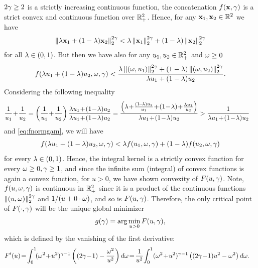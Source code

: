 \documentclass[12pt,onecolumn,journal,draftclsnofoot,letterpaper]{IEEEtran}
\begin{document}
  $2\gamma\geq2$ is a strictly increasing continuous function, the concatenation $f({\mathbf x},\gamma)$ is a strict convex and
  continuous function over ${\mathbb R}_+^2$. Hence, for any ${\mathbf x}_1,{\mathbf x}_2\in{\ensuremath{\mathbb R}}^2$ we have
  \begin{align}
     \left\|\lambda{\ensuremath{\mathbf x}}_1+(1-\lambda){\mathbf x}_2\right\| _2^{2\gamma}<\lambda  \left\|{\mathbf x}_1\right\| _2^{2\gamma} + (1-\lambda) \left\|{\mathbf x}_2\right\| _2^{2\gamma}
  \end{align}
  for all $\lambda\in(0,1)$. But then we have also for any $u_1,u_2\in{\ensuremath{\mathbb R}}^2_+$ and $\omega\geq 0$ 
  \begin{align}
    f(\lambda u_1 +(1-\lambda)u_2,\omega,\gamma) < 
    \frac{\lambda \left\|(\omega,u_1)\right\| _2^{2\gamma} + (1-\lambda) \left\|(\omega,u_2)\right\| _2^{2\gamma}}{\lambda u_1+(1-\lambda)u_2}
    \label{eq:fnormgam}.
  \end{align}
  Considering the following inequality 
  \begin{align}
    \frac{1}{u_1}\! +\!\frac{1}{u_2} &=
       \left(\frac{1}{u_1}\! + \!\frac{1}{u_2}\right)\frac{\lam u_1 \!+\!(1\!-\!\lam)u_2}{\lam u_1 \!+\! (1\!-\!\lam)u_2}
       =\frac{ \left(\lam\! +\!\frac{(1\!-\!\lam)u_2}{u_1}\! +\! (1\!-\!\lam) \!+\! \frac{\lam u_1}{u_2}\right)}{\lam
       u_1 \!+\! (1\!-\!\lam)u_2} 
       > \frac{1}{\lam u_1\! +\! (1\!-\!\lam)u_2}\notag
  \end{align}
  and \eqref{eq:fnormgam}, we will have
  \begin{align}
    f(\lambda u_1 +(1-\lambda)u_2,\omega,\gamma) < \lambda f(u_1,\omega,\gamma) + (1-\lambda)f(u_2,\omega,\gamma) 
  \end{align}
  for every $\lambda\in(0,1)$. Hence, the integral kernel is a strictly convex function for every $\omega\geq0,\gamma\geq 1$, and since the
  infinite sum (integral) of convex functions is again a convex function, for $u>0$, we have shown convexity of $F(u,\gamma)$. 
  Note, $f(u,\omega,\gamma)$ is continuous in ${\mathbb R}_+^2$ since it is a product of the continuous functions
  $ \left\|(u,\omega)\right\| _2^{2\gamma}$ and $1/(u+0\cdot\omega)$, and so is $F(u,\gamma)$. 
  Therefore, the only critical point of $F(\cdot,\gamma)$ will be the unique global minimizer
  \begin{align}
    g(\gamma)=\arg\min_{u>0} F(u,\gamma),
  \end{align}
  which is defined by the  vanishing of the first derivative:
  \begin{align}
    F'(u)  &\!= \!\int_0^{1}\! (\ome^2\!+\!u^2)^{\gam-1} \left( (2\gam\!-\!1)-\frac{\ome^2}{u^2}\right)d\ome
    \!=\!\frac{1}{u^{2}}\!\int_{0}^{1} (\ome^2\!+\!u^2)^{\gam-1}\left((2\gam\!-\!1)u^2-\ome^2\right)d\ome\label{eq:Fderivative}.
  \end{align}
\end{document}
